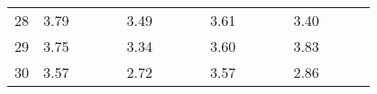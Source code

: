 \begin{center}
\begin{tabular}{| l || c | c | c | c | c | c | c | c | c | c | c | c | c | c | c | c |}
28 & \multirow{1}{*}{ 3.79 }  & & & & \multirow{1}{*}{ 3.49 }  & & & & \multirow{1}{*}{ 3.61 }  & & & & \multirow{1}{*}{ 3.40 }  & & & \\\cline{2-2}\cline{6-6}\cline{10-10}\cline{14-14}
29 & \multirow{1}{*}{ 3.75 }  & & & & \multirow{1}{*}{ 3.34 }  & & & & \multirow{1}{*}{ 3.60 }  & & & & \multirow{1}{*}{ 3.83 }  & & & \\\cline{2-2}\cline{6-6}\cline{10-10}\cline{14-14}
30 & \multirow{1}{*}{ 3.57 }  & & & & \multirow{1}{*}{ 2.72 }  & & & & \multirow{1}{*}{ 3.57 }  & & & & \multirow{1}{*}{ 2.86 }  & & & \\\cline{2-2}\cline{6-6}\cline{10-10}\cline{14-14}\cline{3-3}\cline{7-7}\cline{11-11}\cline{15-15}\cline{4-4}\cline{8-8}\cline{12-12}\cline{16-16}\cline{5-5}\cline{9-9}\cline{13-13}\cline{17-17}
\hline\end{tabular}
\end{center}